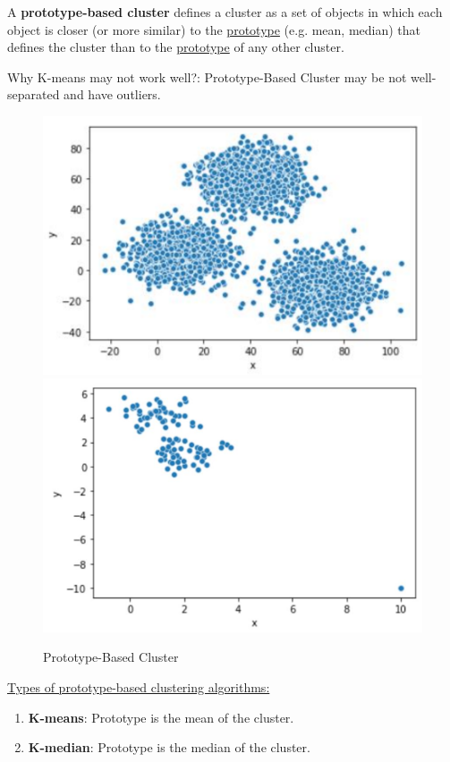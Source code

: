 \documentclass[11pt]{elegantbook}
\begin{document}
\begin{definition}
    A \textbf{prototype-based cluster} defines a cluster as a set of objects in which each object is closer (or more similar) to the \underline{prototype} (e.g. mean, median) that defines the cluster than to the \underline{prototype} of any other cluster.
\end{definition}
Why K-means may not work well?: Prototype-Based Cluster may be not well-separated and have outliers.
\begin{center}\begin{figure}[htbp]
    \centering
    \includegraphics[scale=0.23]{prototype-based.png}
    \includegraphics[scale=0.18]{prototype-based2.png}
    \caption{Prototype-Based Cluster}
\end{figure}\end{center}
\underline{Types of prototype-based clustering algorithms:}
\begin{enumerate}[$\bullet$]
    \item \textbf{K-means}: Prototype is the mean of the cluster.
    \item \textbf{K-median}: Prototype is the median of the cluster.
\end{enumerate}
\end{document}
